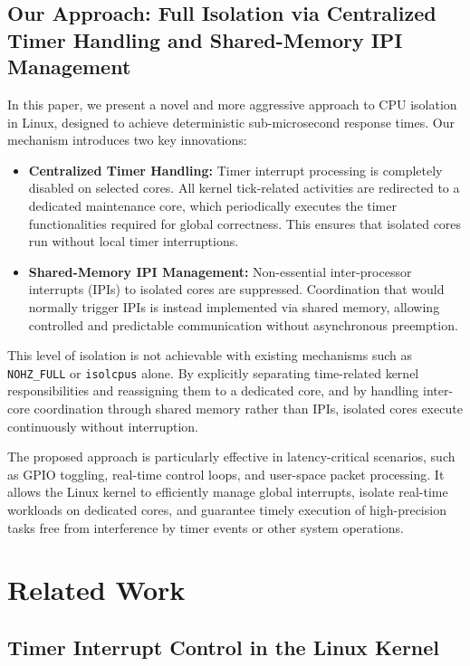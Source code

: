 \documentclass[letterpaper]{article}
\begin{document}
\subsection{Our Approach: Full Isolation via Centralized Timer Handling and Shared-Memory IPI Management}

In this paper, we present a novel and more aggressive approach to CPU isolation in Linux, 
designed to achieve deterministic sub-microsecond response times. 
Our mechanism introduces two key innovations:

\begin{itemize}
    \item \textbf{Centralized Timer Handling:} Timer interrupt processing is completely disabled on selected cores. 
    All kernel tick-related activities are redirected to a dedicated maintenance core, 
    which periodically executes the timer functionalities required for global correctness. 
    This ensures that isolated cores run without local timer interruptions.
    
    \item \textbf{Shared-Memory IPI Management:} Non-essential inter-processor interrupts (IPIs) to isolated cores 
    are suppressed. Coordination that would normally trigger IPIs is instead implemented via shared memory, 
    allowing controlled and predictable communication without asynchronous preemption.
\end{itemize}

This level of isolation is not achievable with existing mechanisms such as 
\texttt{NOHZ\_FULL} or \texttt{isolcpus} alone. 
By explicitly separating time-related kernel responsibilities and reassigning them to a dedicated core, 
and by handling inter-core coordination through shared memory rather than IPIs, 
isolated cores execute continuously without interruption.  

The proposed approach is particularly effective in latency-critical scenarios, 
such as GPIO toggling, real-time control loops, and user-space packet processing. 
It allows the Linux kernel to efficiently manage global interrupts, 
isolate real-time workloads on dedicated cores, and guarantee timely execution 
of high-precision tasks free from interference by timer events or other system operations.

\section{Related Work}\label{BG}
\subsection{Timer Interrupt Control in the Linux Kernel}
\end{document}
